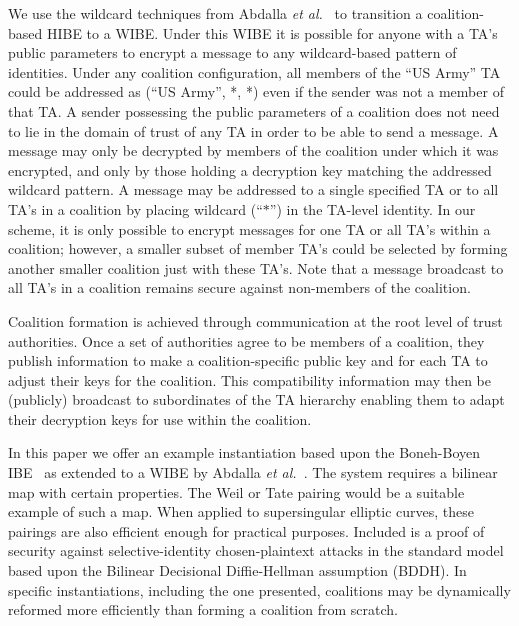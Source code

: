 \documentclass{IEEEtran}
\begin{document}
We use the wildcard techniques from Abdalla \emph{et
al.}~\cite{Abdalla06} to transition a coalition-based HIBE to a
WIBE. Under this WIBE it is possible for anyone with a TA's public
parameters to encrypt a message to any wildcard-based pattern of
identities. Under any coalition configuration, all members of the
``US Army'' TA could be addressed as (``US Army'', *, *) even if the
sender was not a member of that TA. A sender possessing the public
parameters of a coalition does not need to lie in the domain of
trust of any TA in order to be able to send a message. A message may
only be decrypted by members of the coalition under which it was
encrypted, and only by those holding a decryption key matching the
addressed wildcard pattern. A message may be addressed to a single
specified TA or to all TA's in a coalition by placing wildcard
(``$*$'') in the TA-level identity. In our scheme, it is only
possible to encrypt messages for one TA or all TA's within a
coalition; however, a smaller subset of member TA's could be
selected by forming another smaller coalition just with these TA's.
Note that a message broadcast to all TA's in a coalition remains
secure against non-members of the coalition.

Coalition formation is achieved through communication at the root
level of trust authorities. Once a set of authorities agree to be
members of a coalition, they publish information to make a
coalition-specific public key and for each TA to adjust their keys
for the coalition.  This compatibility information may then be
(publicly) broadcast to subordinates of the TA hierarchy enabling
them to adapt their decryption keys for use within the coalition.


In this paper we offer an example instantiation based upon the
Boneh-Boyen IBE~\cite{Boneh04} as extended to a WIBE by Abdalla
\emph{et al.}~\cite{Abdalla06}.  The system requires a bilinear map with certain
properties. The Weil or Tate pairing would be a suitable example of
such a map. When applied to supersingular elliptic curves, these
pairings are also efficient enough for practical purposes. Included
is a proof of security against selective-identity chosen-plaintext
attacks in the standard model based upon the Bilinear Decisional
Diffie-Hellman assumption (BDDH). In specific instantiations,
including the one presented, coalitions may be dynamically reformed
more efficiently than forming a coalition from scratch.
\end{document}
